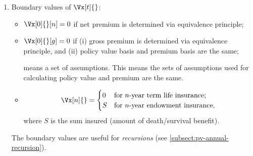 \begin{enumerate}
\begin{intuition}
The definition is ``similar'' to the definition for ``ordinary'' value. Value
of a ``nonrandom'' project at time \(t\) may be defined as the present
value\footnote{The interest rate used is ``risk-free rate''.} of present/future
(nonrandom) net cash (in)flows at time \(t\) . This is also the amount of
 received when the project is ``fairly sold'' at time \(t\)
(intuitively, this is its ``worth'' at time \(t\)).

On the other hand, the policy value at time \(t\) is the \emph{actuarial}
present value of ``future'' cash \emph{outflows} (from the insurer's
 perspective). It may be understood intuitively (and
informally) as ``amount of  \emph{paid} (by )
when the policy  is `fairly transferred' to another party
''. As a ``simple'' framework for reserving, this
amount  may be treated as the amount of reserve held at time
\(t\).
\end{intuition}


\item \label{it:pv-boundary-values}
Boundary values of \(\Vx[t]{}\):
\begin{itemize}
\item \(\Vx[0]{}[n]=0\) if net premium is determined via equivalence principle;
\item \(\Vx[0]{}[g]=0\) if (i) gross premium is determined via equivalence
principle, and (ii) policy value basis and premium basis are the same;
\begin{note}
means a set of assumptions. This means the sets of assumptions used for
calculating policy value and premium are the same.
\end{note}
\item \[
\Vx[n]{}
=\begin{cases}
0&\text{for \(n\)-year term life insurance}; \\
S&\text{for \(n\)-year endowment insurance},
\end{cases}
\]
where \(S\) is the sum insured (amount of death/survival benefit).
\end{itemize}
\begin{note}
The boundary values are useful for \emph{recursions} (see
\cref{subsect:pv-annual-recursion}).
\end{note}
\end{enumerate}
